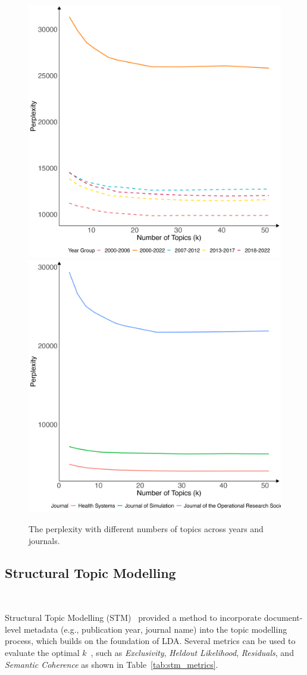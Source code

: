 \documentclass[9pt,twocolumn,twoside]{pnas-new}
\begin{document}
\begin{figure}[!tbhp]
\centering

\includegraphics[width=0.49\linewidth]{bag_words/Perplexity_year.png}
\includegraphics[width=0.49\linewidth]{bag_words/Perplexity_journal.png}

\caption{The perplexity with different numbers of topics across years and journals.}
\label{fig:perplexity}
\end{figure}

\subsection*{Structural Topic Modelling} \

Structural Topic Modelling (STM)~\cite{10.4108/eai.13-7-2018.159623} provided a method to incorporate document-level metadata (e.g., publication year, journal name) into the topic modelling process, which builds on the foundation of LDA.  Several metrics can be used to evaluate the optimal $k$~\cite{stm}, such as \textit{Exclusivity}, \textit{Heldout Likelihood}, \textit{Residuals}, and \textit{Semantic Coherence} as shown in Table~\ref{tab:stm_metrics}.
\end{document}
